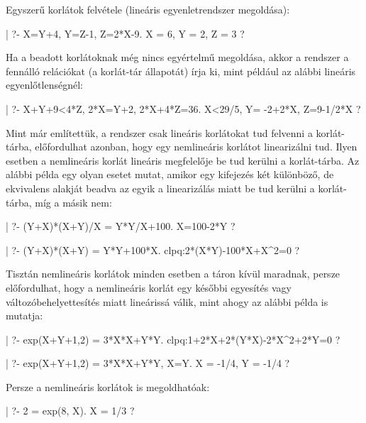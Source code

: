 Egyszerű korlátok felvétele (lineáris egyenletrendszer megoldása):

\begin{prologcode}
| ?- {X=Y+4, Y=Z-1, Z=2*X-9}.   
X = 6, Y = 2, Z = 3 ?
\end{prologcode}

Ha a beadott korlátoknak még nincs egyértelmű megoldása, akkor a
\clpq rendszer a fennálló relációkat (a korlát-tár állapotát)
írja ki, mint például az alábbi lineáris egyenlőtlenségnél:

\begin{prologcode}
| ?- {X+Y+9<4*Z, 2*X=Y+2, 2*X+4*Z=36}.  
{X<29/5}, {Y= -2+2*X}, {Z=9-1/2*X} ?    
\end{prologcode}

Mint már említettük, a \clpq rendszer csak lineáris korlátokat
tud felvenni a korlát-tárba, előfordulhat azonban, hogy egy nemlineáris
korlátot linearizálni tud. Ilyen esetben a nemlineáris korlát lineáris
megfelelője be tud kerülni a korlát-tárba. Az alábbi példa egy olyan esetet
mutat, amikor egy kifejezés két különböző, de ekvivalens alakját beadva az
egyik a linearizálás miatt be tud kerülni a korlát-tárba, míg a másik nem:

\begin{prologcode}
| ?- {(Y+X)*(X+Y)/X = Y*Y/X+100}.       
{X=100-2*Y} ?            %

| ?- {(Y+X)*(X+Y) = Y*Y+100*X}.         
clpq:{2*(X*Y)-100*X+X^2=0} ?             
\end{prologcode}

Tisztán nemlineáris korlátok minden esetben a táron kívül maradnak, persze
előfordulhat, hogy a nemlineáris korlát egy későbbi egyesítés vagy
változóbehelyettesítés miatt lineárissá válik, mint ahogy az alábbi
példa is mutatja:

\begin{prologcode}
| ?- {exp(X+Y+1,2) = 3*X*X+Y*Y}.        
clpq:{1+2*X+2*(Y*X)-2*X^2+2*Y=0} ? 

| ?- {exp(X+Y+1,2) = 3*X*X+Y*Y}, X=Y.   
X = -1/4, Y = -1/4 ?     %
\end{prologcode}

Persze a nemlineáris korlátok is megoldhatóak:

\begin{prologcode}
| ?- {2 = exp(8, X)}.
X = 1/3 ?
\end{prologcode}


